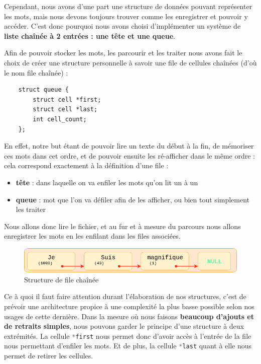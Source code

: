 \documentclass{article}
\newcommand{\inlinecode}[2]{\colorbox{white}{\lstinline[language=#1]$#2$}}
\begin{document}
Cependant, nous avons d'une part une structure de données pouvant représenter les mots, mais nous devons toujours trouver comme les enregistrer et pouvoir y accéder. C'est donc pourquoi nous avons choisi d'implémenter un système de \textbf{liste chaînée à 2 entrées : une tête et une queue}.

Afin de pouvoir stocker les mots, les parcourir et les traiter nous avons fait le choix de créer une structure personnelle à savoir une file de cellules chaînées (d'où le nom file chaînée) :
\begin{lstlisting}
    struct queue {
        struct cell *first;
        struct cell *last;                                                     
        int cell_count;
    }; 
\end{lstlisting}
\label{lst:queue_base}

En effet, notre but étant de pouvoir lire un texte du début à la fin, de mémoriser ces mots dans cet ordre, et de pouvoir ensuite les ré-afficher dans le même ordre : cela correspond exactement à la définition d'une file :
\begin{itemize}
    \item \textbf{tête} : dans laquelle on va enfiler les mots qu'on lit un à un
    \item \textbf{queue} : mot que l'on va défiler afin de les afficher, ou bien tout simplement les traiter
\end{itemize}

Nous allons donc lire le fichier, et au fur et à mesure du parcours nous allons enregistrer les mots en les enfilant dans les files associées.

\begin{figure}[ht!]
\centering
\includegraphics[scale=0.4]{structqueue.png}
\caption{Structure de file chaînée}
\label{fig:structqueue}
\end{figure}

Ce à quoi il faut faire attention durant l'élaboration de nos structures, c'est de prévoir une architecture propice à une complexité la plus basse possible selon nos usages de cette dernière. Dans la mesure où nous faisons \textbf{beaucoup d'ajouts et de retraits simples}, nous pouvons garder le principe d'une structure à deux extrémités.
La cellule \inlinecode{C}{*first} nous permet donc d'avoir accès à l'entrée de la file nous permettant d'enfiler les mots. Et de plus, la cellule \inlinecode{C}{*last} quant à elle nous permet de retirer les cellules.
\end{document}

